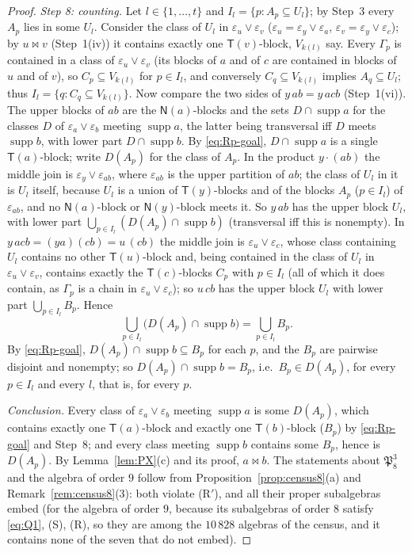 \documentclass[11pt]{amsart}
\theoremstyle{definition}
\newcommand{\supp}{\operatorname{supp}}
\newcommand{\T}{\mathsf{T}}
\newcommand{\N}{\mathsf{N}}
\newcommand{\mt}{\bowtie}   %
\begin{document}
\begin{proof}
\emph{Step 8: counting.} Let $l\in\{1,\dots,t\}$ and $I_l=\{p:A_p\subseteq U_l\}$; by Step~3 every $A_p$ lies in some $U_l$. Consider the class of $U_l$ in $\varepsilon_u\vee\varepsilon_v$ ($\varepsilon_u=\varepsilon_y\vee\varepsilon_a$, $\varepsilon_v=\varepsilon_y\vee\varepsilon_c$); by $u\mt v$ (Step~1(iv)) it contains exactly one $\T(v)$-block, $V_{k(l)}$ say. Every $\Gamma_p$ is contained in a class of $\varepsilon_u\vee\varepsilon_v$ (its blocks of $a$ and of $c$ are contained in blocks of $u$ and of $v$), so $C_p\subseteq V_{k(l)}$ for $p\in I_l$, and conversely $C_q\subseteq V_{k(l)}$ implies $A_q\subseteq U_l$; thus $I_l=\{q:C_q\subseteq V_{k(l)}\}$. Now compare the two sides of $y\,ab=y\,acb$ (Step~1(vi)). The upper blocks of $ab$ are the $\N(a)$-blocks and the sets $D\cap\supp a$ for the classes $D$ of $\varepsilon_a\vee\varepsilon_b$ meeting $\supp a$, the latter being transversal iff $D$ meets $\supp b$, with lower part $D\cap\supp b$. By \eqref{eq:Rp-goal}, $D\cap\supp a$ is a single $\T(a)$-block; write $D(A_p)$ for the class of $A_p$. In the product $y\cdot(ab)$ the middle join is $\varepsilon_y\vee\varepsilon_{ab}$, where $\varepsilon_{ab}$ is the upper partition of $ab$; the class of $U_l$ in it is $U_l$ itself, because $U_l$ is a union of $\T(y)$-blocks and of the blocks $A_p$ ($p\in I_l$) of $\varepsilon_{ab}$, and no $\N(a)$-block or $\N(y)$-block meets it. So $y\,ab$ has the upper block $U_l$, with lower part $\bigcup_{p\in I_l}(D(A_p)\cap\supp b)$ (transversal iff this is nonempty). In $y\,acb=(ya)(cb)=u\,(cb)$ the middle join is $\varepsilon_u\vee\varepsilon_c$, whose class containing $U_l$ contains no other $\T(u)$-block and, being contained in the class of $U_l$ in $\varepsilon_u\vee\varepsilon_v$, contains exactly the $\T(c)$-blocks $C_p$ with $p\in I_l$ (all of which it does contain, as $\Gamma_p$ is a chain in $\varepsilon_u\vee\varepsilon_c$); so $u\,cb$ has the upper block $U_l$ with lower part $\bigcup_{p\in I_l}B_p$. Hence
\[
\bigcup_{p\in I_l}\bigl(D(A_p)\cap\supp b\bigr)=\bigcup_{p\in I_l}B_p .
\]
By \eqref{eq:Rp-goal}, $D(A_p)\cap\supp b\subseteq B_p$ for each $p$, and the $B_p$ are pairwise disjoint and nonempty; so $D(A_p)\cap\supp b=B_p$, i.e.\ $B_p\in D(A_p)$, for every $p\in I_l$ and every $l$, that is, for every $p$.

\emph{Conclusion.} Every class of $\varepsilon_a\vee\varepsilon_b$ meeting $\supp a$ is some $D(A_p)$, which contains exactly one $\T(a)$-block and exactly one $\T(b)$-block ($B_p$) by \eqref{eq:Rp-goal} and Step~8; and every class meeting $\supp b$ contains some $B_p$, hence is $D(A_p)$. By Lemma~\ref{lem:PX}(c) and its proof, $a\mt b$. The statements about $\mathfrak P_8^3$ and the algebra of order $9$ follow from Proposition~\ref{prop:census8}(a) and Remark~\ref{rem:census8}(3): both violate (R$'$), and all their proper subalgebras embed (for the algebra of order $9$, because its subalgebras of order $8$ satisfy \eqref{eq:Q1}, (S), (R), so they are among the $10\,828$ algebras of the census, and it contains none of the seven that do not embed).
\end{proof}
\end{document}
